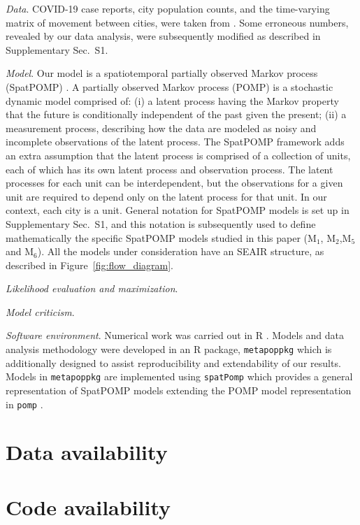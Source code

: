 \documentclass[12pt]{article}\usepackage[]{graphicx}\usepackage[]{xcolor}
\newcommand\LiMobility{M$_1$}
\newcommand\LiParams{M$_2$}
\newcommand\RevisedModelUnconstrained{M$_5$}
\newcommand\RevisedModelConstrained{M$_6$}
\newcommand\code[1]{\texttt{#1}}
\newcommand\suppSecOurModel{S1}
\begin{document}
{\it Data}.
COVID-19 case reports, city population counts, and the time-varying matrix of movement between cities, were taken from \citep{li20}.
Some erroneous numbers, revealed by our data analysis, were subsequently modified as described in Supplementary Sec.~\suppSecOurModel.

{\it Model}.
Our model is a spatiotemporal partially observed Markov process (SpatPOMP) \citep{ionides21}.
A partially observed Markov process (POMP) \citep{breto09,king16} is a stochastic dynamic model comprised of: (i) a latent process having the Markov property that the future is conditionally independent of the past given the present; (ii) a measurement process, describing how the data are modeled as noisy and incomplete observations of the latent process.
The SpatPOMP framework adds an extra assumption that the latent process is comprised of a collection of units, each of which has its own latent process and observation process.
The latent processes for each unit can be interdependent, but the observations for a given unit are required to depend only on the latent process for that unit.
In our context, each city is a unit.
General notation for SpatPOMP models is set up in Supplementary Sec.~\suppSecOurModel, and this notation is subsequently used to define mathematically the specific SpatPOMP models studied in this paper (\LiMobility, \LiParams,\RevisedModelUnconstrained and \RevisedModelConstrained).
All the models under consideration have an SEAIR structure, as described in Figure~\ref{fig:flow_diagram}.

{\it Likelihood evaluation and maximization}.

{\it Model criticism}.

{\it Software environment}.
Numerical work was carried out in R \cite{R}. 
Models and data analysis methodology were developed in an R package, \code{metapoppkg} \cite{metapoppkg} which is additionally designed to assist reproducibility and extendability of our results.
Models in \code{metapoppkg} are implemented using \code{spatPomp} \cite{asfaw23arxiv} which provides a general representation of SpatPOMP models extending the POMP model representation in \code{pomp} \cite{king16}.



\section*{Data availability}

\section*{Code availability}
\end{document}
